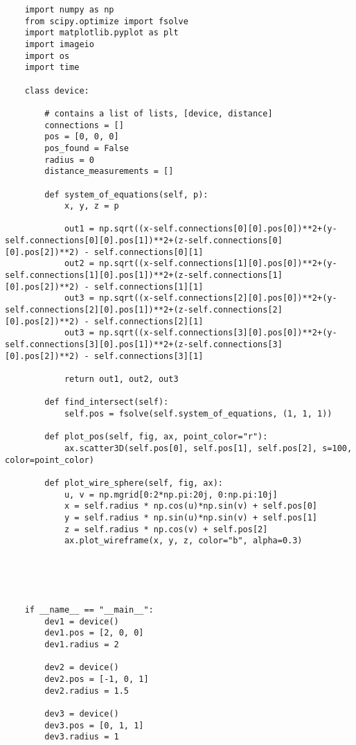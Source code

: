 \begin{lstlisting}
    import numpy as np
    from scipy.optimize import fsolve
    import matplotlib.pyplot as plt
    import imageio
    import os
    import time
    
    class device:
    
        # contains a list of lists, [device, distance]
        connections = []
        pos = [0, 0, 0]
        pos_found = False
        radius = 0
        distance_measurements = []
        
        def system_of_equations(self, p):
            x, y, z = p
            
            out1 = np.sqrt((x-self.connections[0][0].pos[0])**2+(y-self.connections[0][0].pos[1])**2+(z-self.connections[0][0].pos[2])**2) - self.connections[0][1]
            out2 = np.sqrt((x-self.connections[1][0].pos[0])**2+(y-self.connections[1][0].pos[1])**2+(z-self.connections[1][0].pos[2])**2) - self.connections[1][1]
            out3 = np.sqrt((x-self.connections[2][0].pos[0])**2+(y-self.connections[2][0].pos[1])**2+(z-self.connections[2][0].pos[2])**2) - self.connections[2][1]
            out3 = np.sqrt((x-self.connections[3][0].pos[0])**2+(y-self.connections[3][0].pos[1])**2+(z-self.connections[3][0].pos[2])**2) - self.connections[3][1]
    
            return out1, out2, out3
    
        def find_intersect(self):
            self.pos = fsolve(self.system_of_equations, (1, 1, 1))
        
        def plot_pos(self, fig, ax, point_color="r"):
            ax.scatter3D(self.pos[0], self.pos[1], self.pos[2], s=100, color=point_color)
    
        def plot_wire_sphere(self, fig, ax):
            u, v = np.mgrid[0:2*np.pi:20j, 0:np.pi:10j]
            x = self.radius * np.cos(u)*np.sin(v) + self.pos[0]
            y = self.radius * np.sin(u)*np.sin(v) + self.pos[1]
            z = self.radius * np.cos(v) + self.pos[2]
            ax.plot_wireframe(x, y, z, color="b", alpha=0.3)
                
        
            
    
    
    if __name__ == "__main__":
        dev1 = device()
        dev1.pos = [2, 0, 0]
        dev1.radius = 2
        
        dev2 = device()
        dev2.pos = [-1, 0, 1]
        dev2.radius = 1.5
    
        dev3 = device()
        dev3.pos = [0, 1, 1]
        dev3.radius = 1
    

\end{lstlisting}
